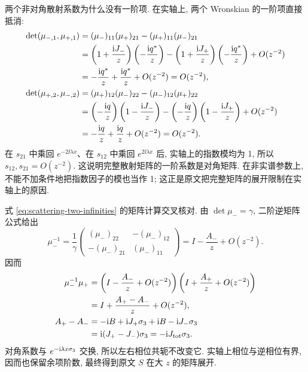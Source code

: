 \par\smallskip\noindent 两个非对角散射系数为什么没有一阶项.\quad
在实轴上, 两个 Wronskian 的一阶项直接抵消:
\begin{align*}
\det(\mu_{-,1},\mu_{+,1})
&=(\mu_-)_{11}(\mu_+)_{21}-(\mu_+)_{11}(\mu_-)_{21}\\
&=\left(1+\dfrac{\mathrm{i} J_-}{z}\right)
\left(-\dfrac{\mathrm{i}{q}^{*}}{z}\right)
-\left(1+\dfrac{\mathrm{i} J_+}{z}\right)
\left(-\dfrac{\mathrm{i}{q}^{*}}{z}\right)+O(z^{-2})\\
&=-\dfrac{\mathrm{i}{q}^{*}}{z}+\dfrac{\mathrm{i}{q}^{*}}{z}+O(z^{-2})
=O(z^{-2}),\\
\det(\mu_{+,2},\mu_{-,2})
&=(\mu_+)_{12}(\mu_-)_{22}-(\mu_-)_{12}(\mu_+)_{22}\\
&=\left(-\dfrac{\mathrm{i} q}{z}\right)
\left(1-\dfrac{\mathrm{i} J_-}{z}\right)
-\left(-\dfrac{\mathrm{i} q}{z}\right)
\left(1-\dfrac{\mathrm{i} J_+}{z}\right)+O(z^{-2})\\
&=-\dfrac{\mathrm{i} q}{z}+\dfrac{\mathrm{i} q}{z}+O(z^{-2})=O(z^{-2}).
\end{align*}
在 $s_{21}$ 中乘回 $e^{-2\ii\lambda x}$、在 $s_{12}$ 中乘回 $e^{2\ii\lambda x}$ 后, 实轴上的指数模均为 1,
所以 $s_{12},s_{21}=O(z^{-2})$.
这说明完整散射矩阵的一阶系数是对角矩阵.
在非实谱参数上, 不能不加条件地把指数因子的模也当作 1;
这正是原文把完整矩阵的展开限制在实轴上的原因.

\par\smallskip\noindent 式 \eqref{eq:scattering-two-infinities} 的矩阵计算交叉核对.\quad
由 $\det\mu_-=\gamma$, 二阶逆矩阵公式给出
\begin{equation*}
\mu_-^{-1}
=\dfrac{1}{\gamma}
\begin{pmatrix}(\mu_-)_{22}&-(\mu_-)_{12}\\
-(\mu_-)_{21}&(\mu_-)_{11}\end{pmatrix}
=I-\dfrac{A_-}{z}+O(z^{-2}).
\end{equation*}
因而
\begin{align*}
\mu_-^{-1}\mu_+
&=\left(I-\dfrac{A_-}{z}+O(z^{-2})\right)
\left(I+\dfrac{A_+}{z}+O(z^{-2})\right)\\
&=I+\dfrac{A_+-A_-}{z}+O(z^{-2}),\\
A_+-A_-
&=-\mathrm{i} B+\mathrm{i} J_+\sigma_3+\mathrm{i} B-\mathrm{i} J_-\sigma_3\\
&=\mathrm{i}(J_+-J_-)\sigma_3=-\mathrm{i} J_{\rm tot}\sigma_3.
\end{align*}
对角系数与 $e^{-\mathrm{i}\lambda x\sigma_3}$ 交换,
所以左右相位共轭不改变它.
实轴上相位与逆相位有界, 因而也保留余项阶数,
最终得到原文 $S$ 在大 $z$ 的矩阵展开.

